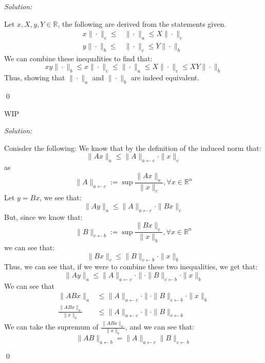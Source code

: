 \documentclass[12pt]{article}
\newenvironment{problem}[2][Problem]{\begin{trivlist}
\item[\hskip \labelsep {\bfseries #1}\hskip \labelsep {\bfseries #2.}]}{\end{trivlist}}
\newenvironment{sol}
    {\emph{Solution:}
    }
    {
    \qed
    }
\newcommand{\R}{\mathbb{R}}
\begin{document}
\newpage
\begin{problem}{2}
    
\end{problem}
\begin{sol}
    Let $x, X, y, Y \in \R$, the following are derived from the statements given.
    \begin{align*}
        x \| \cdot \|_c \leq &\| \cdot \|_a \leq X \| \cdot \|_c\\
        y \| \cdot \|_b \leq &\| \cdot \|_c \leq Y \| \cdot \|_b
    \end{align*}
    We can combine these inequalities to find that:
    \[
    xy \| \cdot \|_b \leq x \| \cdot \|_c \leq \| \cdot \|_a \leq X \| \cdot \|_c \leq  XY \|\cdot\|_b
    \]
    Thus, showing that  $\| \cdot \|_a$ and $\| \cdot \|_b$ are indeed equivalent. 
\end{sol}

\begin{problem}{3}
    WIP
\end{problem}

\begin{problem}{4}
    
\end{problem}
\begin{sol}
    Conisder the following: We know that by the definition of the induced norm that:
    \[
    \|Ax\|_a \leq \| A\|_{a \leftarrow c} \cdot \|x\|_c
    \]
    as 
    \[
    \|A\|_{a \leftarrow c} := \sup \frac{\|Ax\|_a}{\|x\|_c}, \forall x \in \R^n
    \]
    Let $y = Bx$, we see that:
    \[
    \|Ay\|_a \leq \|A\|_{a\leftarrow c} \cdot  \|Bx\|_c
    \]
    But, since we know that:
    \[
    \|B\|_{c \leftarrow b} := \sup \frac{\|Bx\|_c}{\|x\|_b}, \forall x \in \R^n
    \]
    we can see that:
    \[
        \|Bx\|_c \leq \| B\|_{c \leftarrow b} \cdot \|x\|_b
    \]
    Thus, we can see that, if we were to combine these two inequalities, we get that:
    \[
        \|Ay\|_{a} \leq \|A\|_{a\leftarrow c} \cdot \|\cdot \| B\|_{c \leftarrow b} \cdot \|x\|_b
    \]
    We can see that 
    \begin{align*}
        \|ABx\|_{a} & \leq \|A\|_{a\leftarrow c} \cdot \|\cdot \| B\|_{c \leftarrow b} \cdot \|x\|_b\\
        \frac{\|ABx\|_{a}}{\|x\|_b} & \leq \|A\|_{a\leftarrow c} \cdot \|\cdot \| B\|_{c \leftarrow b}
    \end{align*}
    We can take the supremum of $\frac{\|ABx\|_{a}}{\|x\|_b}$, and we can see that:
    \[
    \|AB\|_{a \leftarrow b} = \|A\|_{a \leftarrow c} \|B\|_{c \leftarrow b}
    \]
\end{sol}
\end{document}
